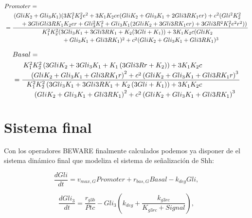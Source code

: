  \begin{equation}
 \begin{split}
  &Promoter=\\&=\frac{\splitdfrac{(Gli K_{2} + Gli_{3} K_{1})(3 K_{1}^{2} K_{2}^{2} e^{2} + 3 K_{1} K_{2} c e (Gli K_{2} + Gli_{3} K_{1} + 2 Gli3R K_{1} e r) +c^{2}(Gli^{2} K_{2}^{2} }{+ 3 Gli Gli3R K_{1} K_{2} e r + Gli_{3}^{2} K_{1}^{2} + Gli_{3} K_{1} (2 Gli K_{2} + 3 Gli3R K_{1} e r) + 3 Gli3R^{2} K_{1}^{2} e^{2} r^{2}))}}{\splitdfrac{K_{1}^{2} K_{2}^{2} (3 Gli_{3} K_{1} + 3 Gli3R K_{1} + K_{2} (3 Gli + K_{1})) + 3 K_{1} K_{2} c (Gli K_{2}}{ + Gli_{3} K_{1} + Gli3R K_{1})^{2} + c^{2} (Gli K_{2} + Gli_{3} K_{1} + Gli3R K_{1})^{3}}}
  \end{split}
 \label{promoter_1}
 \end{equation}
 
 
 \begin{equation}
 \begin{split}
 &Basal=\\&=\frac{\splitdfrac{K_{1}^{2} K_{2}^{2} \left(3 Gli K_{2} + 3 Gli_{3} K_{1} + K_{1} \left(3 Gli3R r + K_{2}\right)\right) + 3 K_{1} K_{2} c}{ \left(Gli K_{2} + Gli_{3} K_{1} + Gli3R K_{1} r\right)^{2} + c^{2} \left(Gli K_{2} + Gli_{3} K_{1} + Gli3R K_{1} r\right)^{3}}}{\splitdfrac{K_{1}^{2} K_{2}^{2} \left(3 Gli_{3} K_{1} + 3 Gli3R K_{1} + K_{2} \left(3 Gli + K_{1}\right)\right) + 3 K_{1} K_{2} c }{\left(Gli K_{2} + Gli_{3} K_{1} + Gli3R K_{1}\right)^{2} + c^{2} \left(Gli K_{2} + Gli_{3} K_{1} + Gli3R K_{1}\right)^{3}}}
 \end{split}
 \label{basa_1}
 \end{equation}
 
   
\section{Sistema final}
 Con los operadores BEWARE finalmente calculados podemos ya disponer de el sistema dinámico final que modeliza el sistema de señalización de Shh:
 
 \begin{equation}
 \frac{dGli}{dt} = v_{max,G}Promoter+r_{bas,G}Basal-k_{deg}Gli,
 \label{eq1:1}
 \end{equation}
 
 \begin{equation}
 \frac{dGli_3}{dt} = \frac{r_{g3b}}{Ptc}-Gli_3\left(k_{deg}+\frac{k_{g3rc}}{K_{g3rc}+Signal}\right),
 \label{eq1:2}
 \end{equation}
 
